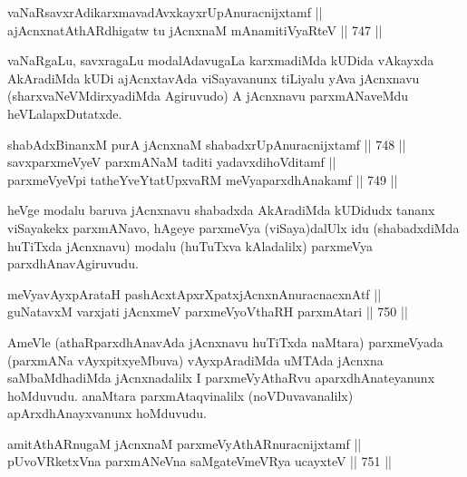 
\begin{shl}
vaNaRsavxrAdikarxmavadAvxkayxrUpAnuracnijxtamf || \\
ajAcnxnatAthARdhigatw tu jAcnxnaM mAnamitiVyaRteV \hfill || 747 ||  
\end{shl}

\begin{artha} 
vaNaRgaLu, savxragaLu modalAdavugaLa karxmadiMda kUDida vAkayxda 
AkAradiMda kUDi ajAcnxtavAda viSayavanunx tiLiyalu yAva jAcnxnavu 
(sharxvaNeVMdirxyadiMda Agiruvudo) A jAcnxnavu parxmANaveMdu 
heVLalapxDutatxde.
\end{artha}


\begin{shl}
shabAdxBinanxM purA jAcnxnaM shabadxrUpAnuracnijxtamf \hfill || 748 ||  \\
savxparxmeVyeV parxmANaM taditi yadavxdihoVditamf || \\
parxmeVyeV\s pi tatheYveYtatUpxvaRM meVyaparxdhAnakamf \hfill || 749 ||  
\end{shl}	

\begin{artha} 
heVge modalu baruva jAcnxnavu shabadxda AkAradiMda kUDidudx tananx viSayakekx parxmANavo, hAgeye parxmeVya (viSaya)dalUlx idu (shabadxdiMda huTiTxda jAcnxnavu) modalu (huTuTxva kAladalilx) parxmeVya parxdhAnavAgiruvudu.
\end{artha}

\begin{shl}
meVyavAyxpArataH pashAcxtApxrXpatxjAcnxnAnuracnacxnAtf || \\
guNatavxM varxjati jAcnxmeV parxmeVyoV\s thaRH parxmAtari \hfill || 750 ||  
\end{shl}

\begin{artha} 
AmeVle (athaRparxdhAnavAda jAcnxnavu huTiTxda naMtara) parxmeVyada (parxmANa vAyxpitxyeMbuva) vAyxpAradiMda uMTAda jAcnxna saMbaMdhadiMda jAcnxnadalilx I parxmeVyAthaRvu aparxdhAnateyanunx hoMduvudu. anaMtara parxmAtaqvinalilx (noVDuvavanalilx) apArxdhAnayxvanunx hoMduvudu.
\end{artha}

\begin{shl}
amitAthARnugaM jAcnxnaM parxmeVyAthARnuracnijxtamf || \\
pUvoVRketxVna parxmANeVna saMgateVmeVRya ucayxteV \hfill || 751 ||  
\end{shl}

